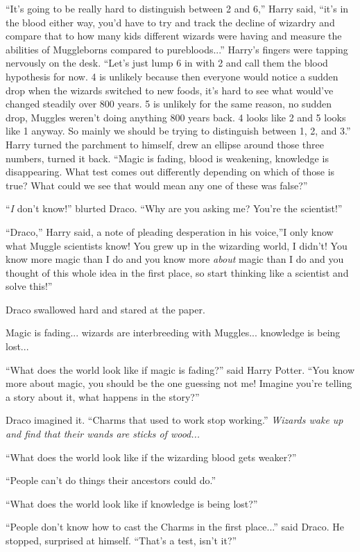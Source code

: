 ``It's going to be really hard to distinguish between 2 and 6,'' Harry
said, ``it's in the blood either way, you'd have to try and track the
decline of wizardry and compare that to how many kids different wizards
were having and measure the abilities of Muggleborns compared to
purebloods...'' Harry's fingers were tapping nervously on the desk.
``Let's just lump 6 in with 2 and call them the blood hypothesis for
now. 4 is unlikely because then everyone would notice a sudden drop when
the wizards switched to new foods, it's hard to see what would've
changed steadily over 800 years. 5 is unlikely for the same reason, no
sudden drop, Muggles weren't doing anything 800 years back. 4 looks like
2 and 5 looks like 1 anyway. So mainly we should be trying to
distinguish between 1, 2, and 3.'' Harry turned the parchment to
himself, drew an ellipse around those three numbers, turned it back.
``Magic is fading, blood is weakening, knowledge is disappearing. What
test comes out differently depending on which of those is true? What
could we see that would mean any one of these was false?''

``\emph{I} don't know!'' blurted Draco. ``Why are you asking me? You're
the scientist!''

``Draco,'' Harry said, a note of pleading desperation in his voice,''I
only know what Muggle scientists know! You grew up in the wizarding
world, I didn't! You know more magic than I do and you know more
\emph{about} magic than I do and you thought of this whole idea in the
first place, so start thinking like a scientist and solve this!''

Draco swallowed hard and stared at the paper.

Magic is fading... wizards are interbreeding with Muggles...
knowledge is being lost...

``What does the world look like if magic is fading?'' said Harry Potter.
``You know more about magic, you should be the one guessing not me!
Imagine you're telling a story about it, what happens in the story?''

Draco imagined it. ``Charms that used to work stop working.''
\emph{Wizards wake up and find that their wands are sticks of
wood...}

``What does the world look like if the wizarding blood gets weaker?''

``People can't do things their ancestors could do.''

``What does the world look like if knowledge is being lost?''

``People don't know how to cast the Charms in the first place...''
said Draco. He stopped, surprised at himself. ``That's a test, isn't
it?''

